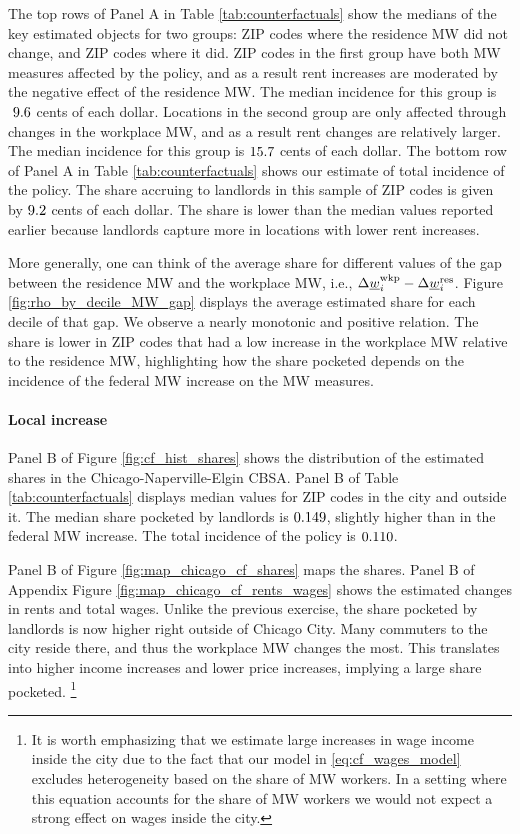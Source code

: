 The top rows of Panel A in Table \ref{tab:counterfactuals} show the medians of 
the key estimated objects for two groups:
ZIP codes where the residence MW did not change, and 
ZIP codes where it did.
ZIP codes in the first group have both MW measures affected by the policy,
and as a result rent increases are moderated by the negative effect of the 
residence MW.
The median incidence for this group is $\textnormal{ 9.6}$ cents of each 
dollar.
Locations in the second group are only affected through changes in the 
workplace MW, and as a result rent changes are relatively larger.
The median incidence for this group is $\textnormal{15.7}$ cents of each 
dollar.
The bottom row of Panel A in Table \ref{tab:counterfactuals} shows our estimate
of total incidence of the policy.
The share accruing to landlords in this sample of ZIP codes is given by 
$\textnormal{9.2}$ cents of each dollar.
The share is lower than the median values reported earlier because landlords 
capture more in locations with lower rent increases.

More generally, one can think of the average share for different values of the 
gap between the residence MW and the workplace MW, i.e., 
$\Delta \underline{w}_i^{\text{wkp}} - \Delta \underline{w}_i^{\text{res}}$.
Figure \ref{fig:rho_by_decile_MW_gap} displays the average estimated share for 
each decile of that gap.
We observe a nearly monotonic and positive relation.
The share is lower in ZIP codes that had a low increase in the workplace MW 
relative to the residence MW, highlighting how the share pocketed depends on
the incidence of the federal MW increase on the MW measures.

\paragraph{Local increase}

Panel B of Figure \ref{fig:cf_hist_shares} shows the distribution of the 
estimated shares in the Chicago-Naperville-Elgin CBSA.
Panel B of Table \ref{tab:counterfactuals} displays median values for ZIP codes
in the city and outside it.
The median share pocketed by landlords is $\textnormal{0.149}$, slightly 
higher than in the federal MW increase.
The total incidence of the policy is $\textnormal{0.110}$.

Panel B of Figure \ref{fig:map_chicago_cf_shares} maps the shares.
Panel B of Appendix Figure \ref{fig:map_chicago_cf_rents_wages} shows the 
estimated changes in rents and total wages.
Unlike the previous exercise, the share pocketed by landlords is now higher 
right outside of Chicago City.
Many commuters to the city reside there, and thus the workplace MW changes the 
most.
This translates into higher income increases and lower price increases, implying
a large share pocketed.%
\footnote{It is worth emphasizing that we estimate large increases in wage income
inside the city due to the fact that our model in \eqref{eq:cf_wages_model}
excludes heterogeneity based on the share of MW workers.
In a setting where this equation accounts for the share of MW workers we would 
not expect a strong effect on wages inside the city.} 

